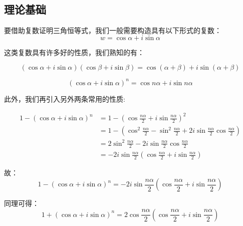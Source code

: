 
\begin{issues}
\issueTODO
{}
\end{issues}


\subsection{理论基础}
要借助复数证明三角恒等式，我们一般需要构造具有以下形式的复数：
$$w=\cos \alpha+i\sin\alpha$$

这类复数具有许多好的性质，我们熟知的有：

\begin{equation}%
(\cos\alpha+i\sin\alpha)(\cos\beta+i\sin\beta)=\cos(\alpha+\beta)+i\sin(\alpha+\beta)
\end{equation}

\begin{equation}%
(\cos\alpha+i\sin\alpha)^n=\cos n\alpha+i\sin n\alpha
\end{equation}

此外，我们再引入另外两条常用的性质:

$$\begin{aligned}
 1-(\cos\alpha+i\sin\alpha)^n&=1-\left(\cos{\frac{n\alpha}2+i\sin{\frac{n\alpha}2}}\right)^{2}\\ &=1-\left(\cos^2{\frac{n\alpha}2}-\sin^2{\frac{n\alpha}2}+2i\sin{\frac{n\alpha}2}\cos{\frac{n\alpha}2}\right)\\ &=2\sin^2{\frac{n\alpha}2}-2i\sin{\frac{n\alpha}2}\cos{\frac{n\alpha}2}\\ &=-2i\sin{\frac{n\alpha}2}\left(\cos{\frac{n\alpha}2}+i\sin{\frac{n\alpha}2}\right) 
\end{aligned}$$

故：
\begin{equation}\label{TriCom_eq4}
1-(\cos\alpha+i\sin\alpha)^n=-2i\sin{\frac{n\alpha}2}\left(\cos{\frac{n\alpha}2}+i\sin{\frac{n\alpha}2}\right)
\end{equation}

同理可得：
\begin{equation}\label{TriCom_eq5}%
1+(\cos\alpha+i\sin\alpha)^n=2\cos{\frac{n\alpha}2}\left(\cos{\frac{n\alpha}2}+i\sin{\frac{n\alpha}2}\right)
\end{equation}

